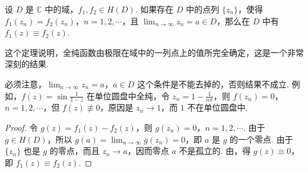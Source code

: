 \documentclass[../../main.tex]{subfiles}
\begin{document}
\begin{theorem}[唯一性定理]\label{theorem:定理4.3.7}
设 \( D \) 是 \( \mathbb{C} \) 中的域，\( f_1, f_2 \in H(D) \). 如果存在 \( D \) 中的点列 \( \{ z_n \} \)，使得 \( f_1(z_n) = f_2(z_n) \)，\( n = 1, 2, \cdots \)，且 \( \lim_{n \to \infty} z_n = a \in D \)，那么在 \( D \) 中有 \( f_1(z) \equiv f_2(z) \).
\end{theorem}
\begin{remark}
这个定理说明，全纯函数由极限在域中的一列点上的值所完全确定，这是一个非常深刻的结果.
\end{remark}
\begin{remark}
必须注意，\(\lim_{n \to \infty} z_n = a\)，\(a \in D\) 这个条件是不能去掉的，否则结果不成立. 例如，\(f(z) = \sin \frac{1}{1 - z}\) 在单位圆盘中全纯，令 \(z_n = 1 - \frac{1}{n\pi}\)，则 \(f(z_n) = 0\)，\(n = 1, 2, \cdots\)，但 \(f(z) \not\equiv 0\)，原因是 \(z_n \to 1\)，而 \(1\) 不在单位圆盘中.
\end{remark}
\begin{proof}
令 \( g(z) = f_1(z) - f_2(z) \)，则 \( g(z_n) = 0 \)，\( n = 1, 2, \cdots \). 由于 \( g \in H(D) \)，所以 \( g(a) = \lim_{n \to \infty} g(z_n) = 0 \)，即 \( a \) 是 \( g \) 的一个零点. 由于 \( \{ z_n \} \) 也是 \( g \) 的零点，而且 \( z_n \to a \)，因而零点 \( a \) 不是孤立的. 由，得 \( g(z) \equiv 0 \)，即 \( f_1(z) \equiv f_2(z) \).
\end{proof}
\end{document}
